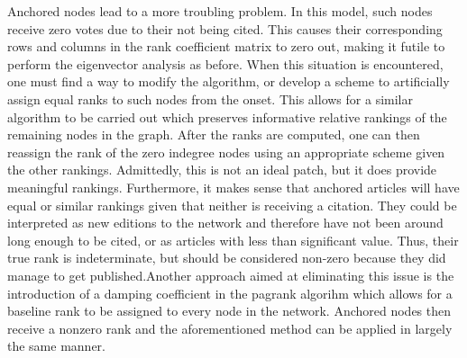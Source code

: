 \documentclass[17pt]{extarticle}
\begin{document}
    Anchored nodes lead to a more troubling problem. In this model, such nodes receive zero votes due to their not being cited. This causes their corresponding rows and columns in the rank coefficient matrix to zero out, making it futile to perform the eigenvector analysis as before. When this situation is encountered, one must find a way to modify the algorithm, or develop a scheme to artificially assign equal ranks to such nodes from the onset. This allows for a similar algorithm to be carried out which preserves informative relative rankings of the remaining nodes in the graph. After the ranks are computed, one can then reassign the rank of the zero indegree nodes using an appropriate scheme given the other rankings. Admittedly, this is not an ideal patch, but it does provide meaningful rankings. Furthermore, it makes sense that anchored articles will have equal or similar rankings given that neither is receiving a citation. They could be interpreted as new editions to the network and therefore have not been around long enough to be cited, or as articles with less than significant value. Thus, their true rank is indeterminate, but should be considered non-zero because they did manage to get published.Another approach aimed at eliminating this issue is the introduction of a damping coefficient in the pagrank algorihm which allows for a baseline rank to be assigned to every node in the network. Anchored nodes then receive a nonzero rank and the aforementioned method can be applied in largely the same manner.
    
  
\end{document}
